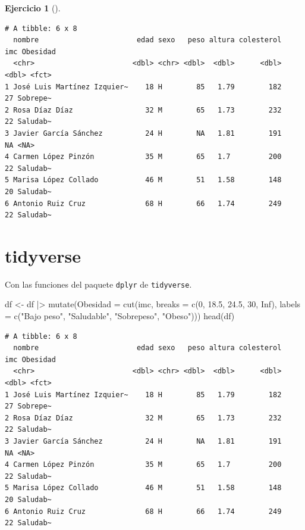 \documentclass[
  spanish,
  a4paper,
]{scrreport}
\newenvironment{Shaded}{\begin{snugshade}}{\end{snugshade}}
\newcommand{\AttributeTok}[1]{\textcolor[rgb]{0.40,0.45,0.13}{#1}}
\newcommand{\ConstantTok}[1]{\textcolor[rgb]{0.56,0.35,0.01}{#1}}
\newcommand{\DecValTok}[1]{\textcolor[rgb]{0.68,0.00,0.00}{#1}}
\newcommand{\FloatTok}[1]{\textcolor[rgb]{0.68,0.00,0.00}{#1}}
\newcommand{\FunctionTok}[1]{\textcolor[rgb]{0.28,0.35,0.67}{#1}}
\newcommand{\NormalTok}[1]{\textcolor[rgb]{0.00,0.23,0.31}{#1}}
\newcommand{\OtherTok}[1]{\textcolor[rgb]{0.00,0.23,0.31}{#1}}
\newcommand{\SpecialCharTok}[1]{\textcolor[rgb]{0.37,0.37,0.37}{#1}}
\newcommand{\StringTok}[1]{\textcolor[rgb]{0.13,0.47,0.30}{#1}}
\theoremstyle{definition}
\newtheorem{exercise}{Ejercicio}[chapter]
\theoremstyle{remark}
\begin{document}
\begin{exercise}[]
\begin{enumerate}
\begin{tcolorbox}
\begin{verbatim}
# A tibble: 6 x 8
  nombre                       edad sexo   peso altura colesterol   imc Obesidad
  <chr>                       <dbl> <chr> <dbl>  <dbl>      <dbl> <dbl> <fct>   
1 José Luis Martínez Izquier~    18 H        85   1.79        182    27 Sobrepe~
2 Rosa Díaz Díaz                 32 M        65   1.73        232    22 Saludab~
3 Javier García Sánchez          24 H        NA   1.81        191    NA <NA>    
4 Carmen López Pinzón            35 M        65   1.7         200    22 Saludab~
5 Marisa López Collado           46 M        51   1.58        148    20 Saludab~
6 Antonio Ruiz Cruz              68 H        66   1.74        249    22 Saludab~
\end{verbatim}

  \section{tidyverse}

  Con las funciones del paquete \texttt{dplyr} de \texttt{tidyverse}.

\begin{Shaded}
\begin{Highlighting}[]
\NormalTok{df }\OtherTok{\textless{}{-}}\NormalTok{ df }\SpecialCharTok{|\textgreater{}}
    \FunctionTok{mutate}\NormalTok{(}\AttributeTok{Obesidad =} \FunctionTok{cut}\NormalTok{(imc, }\AttributeTok{breaks =} \FunctionTok{c}\NormalTok{(}\DecValTok{0}\NormalTok{, }\FloatTok{18.5}\NormalTok{, }\FloatTok{24.5}\NormalTok{, }\DecValTok{30}\NormalTok{, }\ConstantTok{Inf}\NormalTok{), }\AttributeTok{labels =} \FunctionTok{c}\NormalTok{(}\StringTok{"Bajo peso"}\NormalTok{, }\StringTok{"Saludable"}\NormalTok{, }\StringTok{"Sobrepeso"}\NormalTok{, }\StringTok{"Obeso"}\NormalTok{)))}
\FunctionTok{head}\NormalTok{(df)}
\end{Highlighting}
\end{Shaded}

\begin{verbatim}
# A tibble: 6 x 8
  nombre                       edad sexo   peso altura colesterol   imc Obesidad
  <chr>                       <dbl> <chr> <dbl>  <dbl>      <dbl> <dbl> <fct>   
1 José Luis Martínez Izquier~    18 H        85   1.79        182    27 Sobrepe~
2 Rosa Díaz Díaz                 32 M        65   1.73        232    22 Saludab~
3 Javier García Sánchez          24 H        NA   1.81        191    NA <NA>    
4 Carmen López Pinzón            35 M        65   1.7         200    22 Saludab~
5 Marisa López Collado           46 M        51   1.58        148    20 Saludab~
6 Antonio Ruiz Cruz              68 H        66   1.74        249    22 Saludab~
\end{verbatim}


\end{tcolorbox}
\end{enumerate}
\end{exercise}
\end{document}
